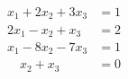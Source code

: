 \begin{align*}
x_1 + 2x_2 + 3x_3 &= 1\\
2x_1 - x_2 + x_3 &= 2\\
x_1 - 8x_2 - 7x_3 &= 1\\
\quad x_2 + x_3 &= 0
\end{align*}